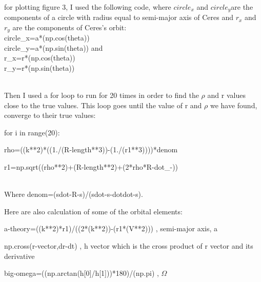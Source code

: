 \documentclass[letterpaper,12pt]{article}
\begin{document}
\\for plotting figure 3, I used the following code, where \begin{math} circle_x \end{math} and \begin{math} circle_y \end{math}are the components of a circle with radius equal to semi-major axis of Ceres and \begin{math} r_x \end{math} and \begin{math} r_y  \end{math} are the components of Ceres's orbit:
\\circle_x=a*(np.cos(theta))
\\circle_y=a*(np.sin(theta))
 and 
\\r_x=r*(np.cos(theta))
\\r_y=r*(np.sin(theta))


\\Then I used a for loop to run for 20 times in order to find the \begin{math} \rho \end{math} and r values close to the true values. This loop goes until the value of r and \begin{math} \rho \end{math} we have found, converge to their true values:

for i in range(20):

rho=((k**2)*((1./(R-length**3))-(1./(r1**3))))*denom

r1=np.sqrt((rho**2)+(R-length**2)+(2*rho*R-dot_-))
    
\\Where denom=(sdot-R-s)/(sdot-s-dotdot-s).

Here are also calculation of some of the orbital elements:

a-theory=((k**2)*r1)/((2*(k**2))-(r1*(V**2)))       ,        semi-major axis, a

np.cross(r-vector,dr-dt)        ,       h vector which is the cross product of r vector and its derivative

big-omega=((np.arctan(h[0]/h[1]))*180)/(np.pi)        ,     \begin{math} \Omega \end{math}


 

\end{document}

